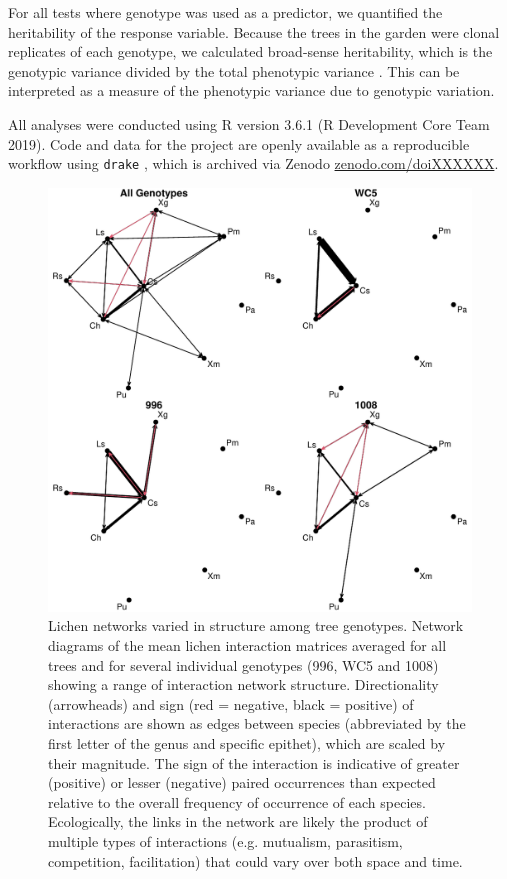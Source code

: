\documentclass[fleqn,12pt]{olplainarticle}
\begin{document}
For all tests where genotype was used as a predictor, we quantified
the heritability of the response variable. Because the trees in the
garden were clonal replicates of each genotype, we calculated
broad-sense heritability, which is the genotypic variance divided by
the total phenotypic variance \citep{Conner2004ATextbook}. This can be
interpreted as a measure of the phenotypic variance due to genotypic
variation. 

All analyses were conducted using R version 3.6.1 (R Development Core
Team 2019). Code and data for the project are openly available as a
reproducible workflow using \texttt{drake} \citep{drake}, which is
archived via Zenodo \url{zenodo.com/doiXXXXXX}. 

\begin{figure}[ht]
\centering
\includegraphics[width=\linewidth]{figures/cn_onc.pdf}
\caption{Lichen networks varied in structure among tree
  genotypes. Network diagrams of the mean lichen interaction matrices
  averaged for all trees and for several individual genotypes (996,
  WC5 and 1008) showing a range of interaction network
  structure. Directionality (arrowheads) and sign (red = negative,
  black = positive) of interactions are shown as edges between species
  (abbreviated by the first letter of the genus and specific epithet),
  which are scaled by their magnitude. The sign of the interaction is
  indicative of greater (positive) or lesser (negative) paired
  occurrences than expected relative to the overall frequency of
  occurrence of each species. Ecologically, the links in the network
  are likely the product of multiple types of interactions
  (e.g. mutualism, parasitism, competition, facilitation) that could
  vary over both space and time.}
\label{fig:geno_nets}
\end{figure}
\end{document}
